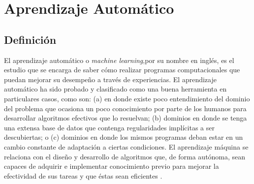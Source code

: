 \section{Aprendizaje Automático}

\subsection{Definición}

El aprendizaje automático o \textit{machine learning},por su nombre en inglés, es el estudio que se encarga de saber cómo realizar programas computacionales que puedan mejorar su desempeño a través de experiencias. El aprendizaje automático ha sido probado y clasificado como una buena herramienta en particulares casos, como son: (a) en donde existe poco entendimiento del dominio del problema que ocasiona un poco conocimiento por parte de los humanos para desarrollar algoritmos efectivos que lo resuelvan; (b) dominios en donde se tenga una extensa base de datos que contenga regularidades implícitas a ser descubiertas; o (c) dominios en donde los mismos programas deban estar en un cambio constante de adaptación a ciertas condiciones. El aprendizaje máquina se relaciona con el diseño y desarrollo de algoritmos que, de forma autónoma, sean capaces de adquirir e implementar conocimiento previo para mejorar la efectividad de sus tareas y que éstas sean eficientes \cite{defmach}.\\
